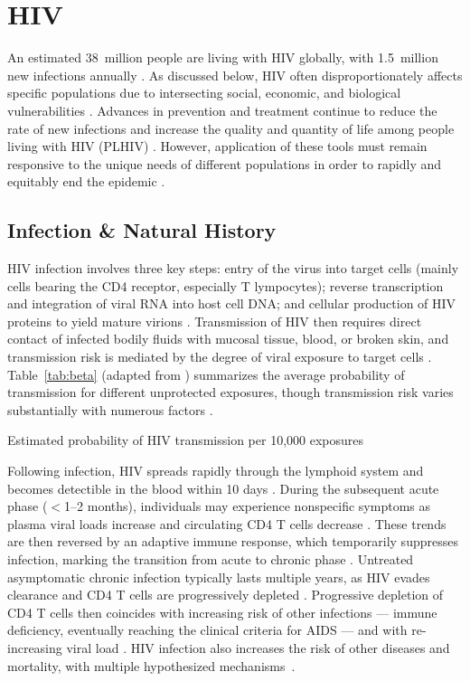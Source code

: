 \section{HIV}\label{intro.hiv}
An estimated 38~million people are living with HIV globally,
with 1.5~million new infections annually \cite{AIDSinfo}.
As discussed below, HIV often disproportionately affects specific populations
due to intersecting social, economic, and biological vulnerabilities \cite{WHO2016kp,Jin2021}.
Advances in prevention and treatment continue to reduce the rate of new infections and
increase the quality and quantity of life among people living with HIV (PLHIV) \cite{Eisinger2019tk}.
However, application of these tools must remain responsive to
the unique needs of different populations
in order to rapidly and equitably end the epidemic \cite{Eisinger2019tk}.
\subsection{Infection \& Natural History}\label{intro.hiv.tinh}
HIV infection involves three key steps:
entry of the virus into target cells
(mainly cells bearing the CD4 receptor, especially T lympocytes);
reverse transcription and integration of viral RNA into host cell DNA; and
cellular production of HIV proteins to yield mature virions \cite{Maartens2014,Deeks2015}.
Transmission of HIV then requires
direct contact of infected bodily fluids with mucosal tissue, blood, or broken skin,
and transmission risk is mediated by the degree of viral exposure to target cells \cite{Deeks2015}.
Table~\ref{tab:beta} (adapted from \cite{Patel2014}) summarizes
the average probability of transmission for different unprotected exposures,
though transmission risk varies substantially with numerous factors \cite{Boily2009}.
\begin{table}
  \caption{Estimated probability of HIV transmission per 10,000 exposures}
  \label{tab:beta}
  \centering
  
\end{table}
\par
Following infection, HIV spreads rapidly through the lymphoid system
and becomes detectible in the blood within 10 days \cite{Deeks2015}.
During the subsequent acute phase ($<$1--2 months),
individuals may experience nonspecific symptoms
as plasma viral loads increase and circulating CD4 T cells decrease
\cite{Cohen2011ahi,Maartens2014,Deeks2015}.
These trends are then reversed by an adaptive immune response,
which temporarily suppresses infection,
marking the transition from acute to chronic phase \cite{Maartens2014,Deeks2015}.
Untreated asymptomatic chronic infection typically lasts multiple years,
as HIV evades clearance and CD4 T cells are progressively depleted \cite{Deeks2015}.
Progressive depletion of CD4 T cells then coincides with increasing risk of other infections
--- \ie immune deficiency, eventually reaching the clinical criteria for AIDS \cite{WHO2016art} ---
and with re-increasing viral load \cite{Maartens2014,Deeks2015}.
HIV infection also increases the risk of other diseases and mortality,
with multiple hypothesized mechanisms~\cite{Phillips2008}.

